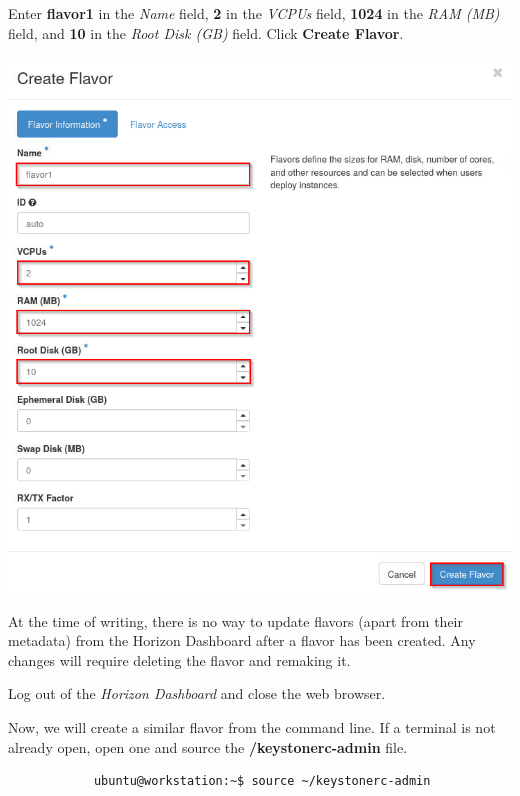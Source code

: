 \documentclass[letterpaper, 12pt]{article}
\begin{document}
\begin{enumerate}
    \begin{labstep}
        Enter \textbf{flavor1} in the \textit{Name} field, \textbf{2} in the \textit{VCPUs} field, \textbf{1024} in the \textit{RAM (MB)} field, and \textbf{10} in the \textit{Root Disk (GB)} field.
        Click \textbf{Create Flavor}.

        \begin{center}
            \includegraphics[width=\linewidth]{images/part2/step4.png}
        \end{center}
    \end{labstep}

    \begin{notebox}
        At the time of writing, there is no way to update flavors (apart from their metadata) from the Horizon Dashboard after a flavor has been created.
        Any changes will require deleting the flavor and remaking it.
    \end{notebox}

    \begin{labstep}
        Log out of the \textit{Horizon Dashboard} and close the web browser.
    \end{labstep}

    \begin{labstep}
        Now, we will create a similar flavor from the command line.
        If a terminal is not already open, open one and source the \textbf{\texttildemid/keystonerc-admin} file.
        \begin{lstlisting}
            ubuntu@workstation:~$ source ~/keystonerc-admin
        \end{lstlisting}


\end{labstep}
\end{enumerate}
\end{document}
